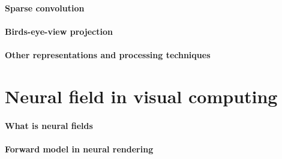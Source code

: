 \paragraph{Sparse convolution}

\paragraph{Birds-eye-view projection}

\paragraph{Other representations and processing techniques}


\section{Neural field in visual computing}
\label{sec:bg_neural_field}











\paragraph{What is neural fields}
\paragraph{Forward model in neural rendering}